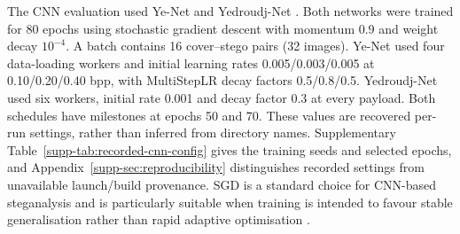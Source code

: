 \documentclass[pdflatex,sn-mathphys-num]{sn-jnl}%
\theoremstyle{definition}
\theoremstyle{game}
\theoremstyle{thmstyleone}%
\theoremstyle{thmstyletwo}%
\theoremstyle{thmstylethree}%
\begin{document}
The CNN evaluation used Ye-Net
\cite{ye2017deep} and Yedroudj-Net
\cite{yedroudj2018yedroudj}. Both networks were trained for
80 epochs using stochastic gradient descent with momentum $0.9$ and
weight decay $10^{-4}$. A batch contains 16 cover--stego pairs (32 images).
Ye-Net used four data-loading workers and initial learning rates
0.005/0.003/0.005 at 0.10/0.20/0.40 bpp, with MultiStepLR decay factors
0.5/0.8/0.5. Yedroudj-Net used six workers, initial rate 0.001 and decay
factor 0.3 at every payload. Both schedules have milestones at epochs
50 and 70. These values are recovered per-run settings, rather than
inferred from directory names. Supplementary
Table~\ref{supp-tab:recorded-cnn-config} gives the training seeds and
selected epochs, and Appendix~\ref{supp-sec:reproducibility} distinguishes
recorded settings from unavailable launch/build provenance. SGD is a standard choice for CNN-based steganalysis and is particularly suitable when training is intended to favour stable
generalisation rather than rapid adaptive optimisation
\cite{yedroudj2018yedroudj}.

\end{document}
